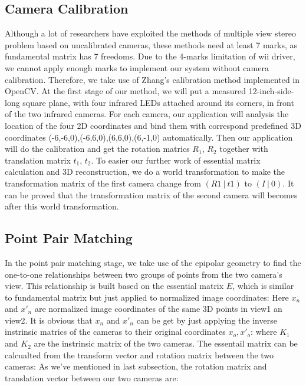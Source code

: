 \documentclass[10pt,twocolumn,letterpaper]{article}
\begin{document}
\subsection{Camera Calibration}
Although a lot of researchers have exploited the methods of multiple view stereo problem based on uncalibrated cameras, these methods need at least 7 marks, as fundamental matrix has 7 freedoms. Due to the 4-marks limitation of wii driver, we cannot apply enough marks to implement our system without camera calibration. Therefore, we take use of Zhang's calibration method implemented in OpenCV. At the first stage of our method, we will put a measured 12-inch-side-long square plane, with four infrared LEDs attached around its corners, in front of the two infrared cameras. For each camera, our application will analysis the location of the four 2D coordinates and bind them with correspond predefined 3D coordinates (-6,-6,0),(-6,6,0),(6,6,0),(6,-1,0) automatically. Then our application will do the calibration and get the rotation matrics $R_{1}$, $R_{2}$ together with translation matrix $t_{1}$, $t_{2}$. To easier our further work of essential matrix calculation and 3D reconstruction, we do a world transformation to make the transformation matrix of the first camera change from $( R1~ | ~t1 )$ to $( I~ | ~0 )$. It can be proved that the transformation matrix of the second camera will becomes 
\endequation after this world transformation. 

\subsection{Point Pair Matching}
In the point pair matching stage, we take use of the epipolar geometry to find the one-to-one relationships between two groups of points from the two camera's view. This relationship is built based on the essential matrix $E$, which is similar to fundamental matrix but just applied to normalized image coordinates: \endequation Here $x_{n}$ and $x'_{n}$ are normalized image coordinates of the same 3D points in view1 an view2. It is obvious that $x_{n}$ and $x'_{n}$ can be get by just applying the inverse instrinsic matrics of the cameras to their original coordinates $x_{o}, x'_{o}$: \endequation where $K_{1}$ and $K_{2}$ are the instrinsic matrix of the two cameras.
The essentail matrix can be calcualted from the transform vector and rotation matrix between the two cameras: \endequation
As we've mentioned in last subsection, the rotation matrix and translation vector between our two cameras are: \endequation {}\endequation 
\end{document}
